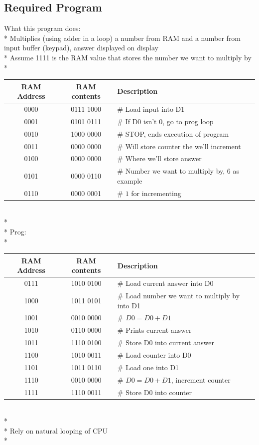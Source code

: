 \documentclass{mcgillhomework}
\begin{document}
	\subsection{Required Program}
	What this program does:
	\\*  Multiplies (using adder in a loop) a number from RAM and a number from input buffer (keypad), answer displayed on display
	\\* Assume 1111 is the RAM value that stores the number we want to multiply by
	\\*
	\begin{tabular}{|c|c|l|}
		\hline \textbf{RAM Address} & \textbf{RAM contents} & \textbf{Description}
		\\* \hline 	0000	& 0111 1000 & \# Load input into D1
		\\* \hline 	0001	& 0101 0111 & \# If D0 isn't $0$, go to prog loop
		\\* \hline 	0010	& 1000 0000 & \# STOP, ends execution of program
		\\* \hline 	0011	& 0000 0000 & \# Will store counter the we'll increment
		\\* \hline 	0100	& 0000 0000 & \# Where we'll store answer
		\\* \hline 	0101	& 0000 0110 & \# Number we want to multiply by, 6 as example
		\\* \hline 	0110	& 0000 0001 & \# $1$ for incrementing
		\\ \hline
	\end{tabular}
	\\*
	\\* Prog:
	\\*
	\begin{tabular}{|c|c|l|}
		\hline \textbf{RAM Address} & \textbf{RAM contents} & \textbf{Description}
		\\* \hline 	0111	& 1010 0100 & \# Load current answer into D0
		\\* \hline 	1000	& 1011 0101 & \# Load number we want to multiply by into D1
		\\* \hline 	1001	& 0010 0000 & \# $D0=D0+D1$
		\\* \hline 	1010	& 0110 0000 & \# Prints current answer
		\\* \hline 	1011	& 1110 0100 & \# Store D0 into current answer
		\\* \hline 	1100	& 1010 0011 & \# Load counter into D0
		\\* \hline 	1101	& 1011 0110 & \# Load one into D1
		\\* \hline 	1110	& 0010 0000 & \# $D0=D0+D1$, increment counter
		\\* \hline 	1111	& 1110 0011 & \# Store D0 into counter
		\\ \hline
	\end{tabular}
	\\*
	\\* Rely on natural looping of CPU
	\\*
\end{document}
